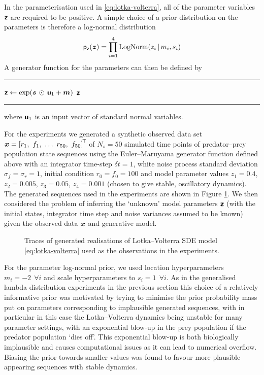 In the parameterisation used in \eqref{eq:lotka-volterra}, all of the parameter variables $\boldsymbol{\mathsf{z}}$ are required to be positive. A simple choice of a prior distribution on the parameters is therefore a log-normal distribution
\begin{equation}
  \mathsf{p}_{\boldsymbol{\mathsf{z}}}(\boldsymbol{z}) = \prod_{i=1}^4 \textrm{LogNorm}(z_i \operatorname{|} m_i, s_i)
\end{equation}
A generator function for the parameters can then be defined by
\vspace{3mm}
\hrule
\begin{algorithmic}
\small
{}
  \State $\boldsymbol{\mathsf{z}} \gets \exp(\boldsymbol{s} \,\odot\, \boldsymbol{\mathsf{u}}_1 + \boldsymbol{m})$
  \State \Return $\boldsymbol{\mathsf{z}}$
\EndFunction
\end{algorithmic}
\vspace{0mm}
\hrule
\vspace{1mm}
where $\boldsymbol{\mathsf{u}}_1$ is an input vector of standard normal variables.

For the experiments we generated a synthetic observed data set $\vct{x} = \lsb r_1, ~ f_1, ~ \dots ~ {r}_{50}, ~ {f}_{50} \rsb\tr$ of $N_s = 50$ simulated time points of predator--prey population state sequences using the Euler--Maruyama generator function defined above with an integrator time-step $\delta t = 1$, white noise process standard deviation $\sigma_f = \sigma_r = 1$, initial condition $r_0 = f_0 = 100$ and model parameter values ${z}_1=0.4$, ${z}_2 = 0.005$,  ${z}_3=0.05$, ${z}_4=0.001$ (chosen to give stable, oscillatory dynamics). The generated sequences used in the experiments are shown in Figure \ref{fig:lotka-volterra-observed-state-seq}. We then considered the problem of inferring the `unknown' model parameters $\boldsymbol{\mathsf{z}}$ (with the initial states, integrator time step and noise variances assumed to be known) given the observed data $\boldsymbol{x}$ and generative model. 

\begin{figure}[t]
\centering
{}
\vspace{-5mm}
\caption[Generated Lotka--Volterra sequences.]{Traces of generated realisations of Lotka--Volterra \ac{SDE} model \eqref{eq:lotka-volterra} used as the observations in the experiments.}
\label{fig:lotka-volterra-observed-state-seq}
\end{figure}

For the parameter log-normal prior, we used location hyperparameters $m_i = -2 ~~\forall i$ and scale hyperparameters to $s_i = 1 ~~\forall i$. As in the generalised lambda distribution experiments in the previous section this choice of a relatively informative prior was motivated by trying to minimise the prior probability mass put on parameters corresponding to implausible generated sequences, with in particular in this case the Lotka--Volterra dynamics being unstable for many parameter settings, with an exponential blow-up in the prey population if the predator population `dies off'. This exponential blow-up is both biologically implausible and causes computational issues as it can lead to numerical overflow. Biasing the prior towards smaller values was found to favour more plausible appearing sequences with stable dynamics.

